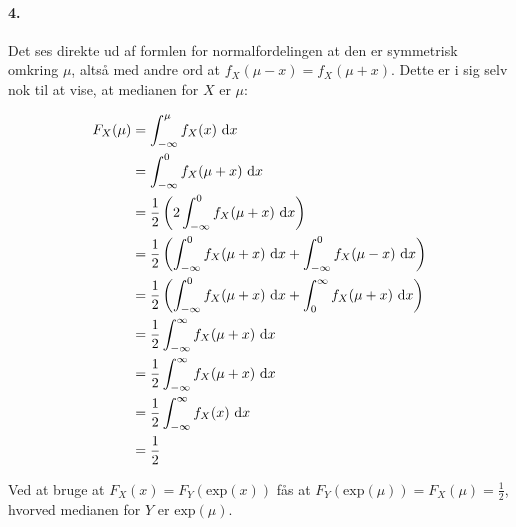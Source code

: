 \paragraph{4.} Det ses direkte ud af formlen for normalfordelingen at den er
symmetrisk omkring $\mu$, altså med andre ord at $f_X(\mu - x) = f_X(\mu +
x)$. Dette er i sig selv nok til at vise, at medianen for $X$ er $\mu$:

\begin{align*}
F_X(\mu) &= \int_{-\infty}^\mu f_X(x)\ \mathrm{d} x \\
&=\int_{-\infty}^0 f_X(\mu + x)\ \mathrm{d} x \\
&=\frac{1}{2}\left(2\int_{-\infty}^0 f_X(\mu + x)\ \mathrm{d} x\right) \\
&=\frac{1}{2}\left(\int_{-\infty}^0 f_X(\mu + x)\ \mathrm{d} x + \int_{-\infty}^0 f_X(\mu - x)\ \mathrm{d} x\right) \\
&=\frac{1}{2}\left(\int_{-\infty}^0 f_X(\mu + x)\ \mathrm{d} x + \int_0^\infty f_X(\mu + x)\ \mathrm{d} x\right) \\
&=\frac{1}{2}\int_{-\infty}^\infty f_X(\mu + x)\ \mathrm{d} x \\
&=\frac{1}{2}\int_{-\infty}^\infty f_X(\mu + x)\ \mathrm{d} x \\
&=\frac{1}{2}\int_{-\infty}^\infty f_X(x)\ \mathrm{d} x \\
&=\frac{1}{2}
\end{align*}

Ved at bruge at $F_X(x) = F_Y(\mathrm{exp}(x))$ fås at
$F_Y(\mathrm{exp}(\mu)) = F_X(\mu) = \frac{1}{2}$, hvorved medianen for $Y$
er $\mathrm{exp}(\mu)$.
